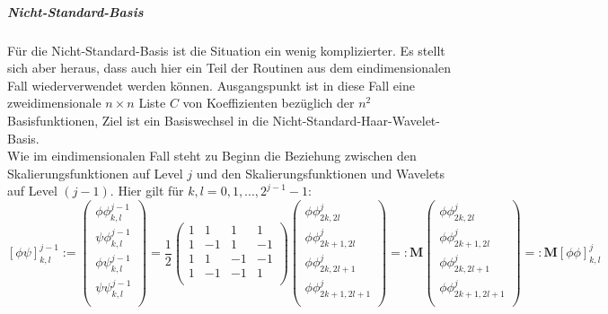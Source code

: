 \subparagraph{Nicht-Standard-Basis} Für die Nicht-Standard-Basis ist die Situation ein wenig komplizierter. Es stellt sich aber heraus, dass auch hier ein Teil der Routinen aus dem eindimensionalen Fall wiederverwendet werden können. Ausgangspunkt ist in diese Fall eine zweidimensionale $n \times n$ Liste $C$ von Koeffizienten bezüglich der $n^2$ Basisfunktionen, Ziel ist ein Basiswechsel in die Nicht-Standard-Haar-Wavelet-Basis.\\
Wie im eindimensionalen Fall steht zu Beginn die Beziehung zwischen den Skalierungsfunktionen auf Level $j$ und den Skalierungsfunktionen und Wavelets auf Level $(j-1)$. Hier gilt für $k, l = 0, 1, ..., 2^{j-1}-1$:
%
\[
\left[ \phi\psi \right]_{k,l}^{j-1}
:=
\begin{pmatrix}
\phi\phi_{k,l}^{j-1} \\
\psi\phi_{k,l}^{j-1} \\
\phi\psi_{k,l}^{j-1} \\
\psi\psi_{k,l}^{j-1} \\
\end{pmatrix}
= \frac{1}{2}
\begin{pmatrix}
1 & 1 & 1 & 1 \\
1 & -1 & 1 & -1 \\
1 & 1 & -1 & -1 \\
1 & -1 & -1 & 1 \\
\end{pmatrix}
\begin{pmatrix}
\phi\phi_{2k,2l}^{j} \\
\phi\phi_{2k+1,2l}^{j} \\
\phi\phi_{2k,2l+1}^{j} \\
\phi\phi_{2k+1,2l+1}^{j} \\
\end{pmatrix}
=:
\mathbf{M}
\begin{pmatrix}
\phi\phi_{2k,2l}^{j} \\
\phi\phi_{2k+1,2l}^{j} \\
\phi\phi_{2k,2l+1}^{j} \\
\phi\phi_{2k+1,2l+1}^{j} \\
\end{pmatrix}
=:
\mathbf{M}
\left[ \phi\phi \right]_{k,l}^j
\]
